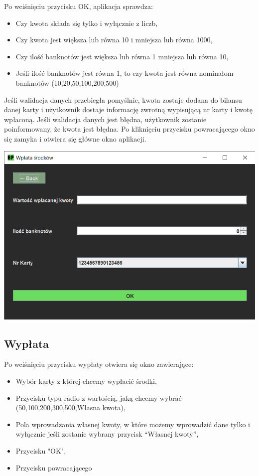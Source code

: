 \documentclass[12pt, letterpaper]{article}
\begin{document}
\quad Po wciśnięciu przycisku OK, aplikacja sprawdza:

\begin{itemize}
\item Czy kwota składa się tylko i wyłącznie z liczb,
\item Czy kwota jest większa lub równa 10 i mniejsza lub równa 1000,
\item Czy ilość banknotów jest większa lub równa 1 mniejsza lub równa 10,
\item Jeśli ilość banknotów jest równa 1, to czy kwota jest równa nominałom banknotów (10,20,50,100,200,500)
\end{itemize}

\quad Jeśli walidacja danych przebiegła pomyślnie, kwota zostaje dodana do bilansu danej karty i użytkownik dostaje informację zwrotną wypisującą nr karty i kwotę wpłaconą. 
Jeśli walidacja danych jest błędna, użytkownik zostanie poinformowany, że kwota jest błędna.
Po kliknięciu przycisku powracającego okno się zamyka i otwiera się główne okno aplikacji.

\begin{center}
	\includegraphics[scale=0.6]{wplata}
\end{center}

\newpage

\subsection{Wypłata}

\quad Po wciśnięciu przycisku wypłaty otwiera się okno zawierające:

\begin{itemize}
\item Wybór karty z której chcemy wypłacić środki,
\item Przycisku typu radio z wartością, jaką chcemy wybrać (50,100,200,300,500,Własna kwota),
\item Pola wprowadzania własnej kwoty, w które możemy wprowadzić dane tylko i wyłącznie jeśli zostanie wybrany przycisk “Własnej kwoty”,
\item Przycisku "OK",
\item Przycisku powracającego
\end{itemize}
\end{document}
